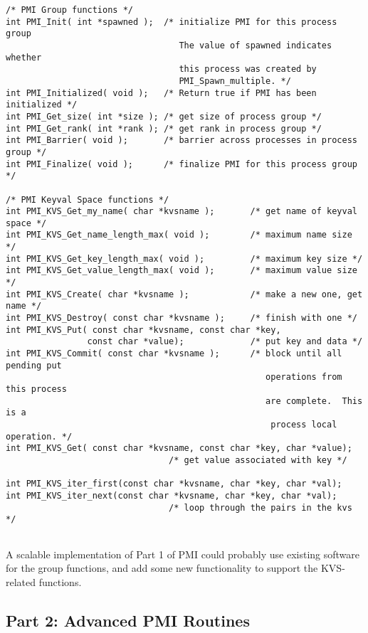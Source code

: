 \documentclass[11pt]{article}
\begin{document}
\begin{small}
\begin{verbatim}
/* PMI Group functions */
int PMI_Init( int *spawned );  /* initialize PMI for this process group
                                  The value of spawned indicates whether
                                  this process was created by
                                  PMI_Spawn_multiple. */
int PMI_Initialized( void );   /* Return true if PMI has been initialized */
int PMI_Get_size( int *size ); /* get size of process group */
int PMI_Get_rank( int *rank ); /* get rank in process group */
int PMI_Barrier( void );       /* barrier across processes in process group */
int PMI_Finalize( void );      /* finalize PMI for this process group */

/* PMI Keyval Space functions */
int PMI_KVS_Get_my_name( char *kvsname );       /* get name of keyval space */
int PMI_KVS_Get_name_length_max( void );        /* maximum name size */
int PMI_KVS_Get_key_length_max( void );         /* maximum key size */
int PMI_KVS_Get_value_length_max( void );       /* maximum value size */
int PMI_KVS_Create( char *kvsname );            /* make a new one, get name */
int PMI_KVS_Destroy( const char *kvsname );     /* finish with one */
int PMI_KVS_Put( const char *kvsname, const char *key,
                const char *value);             /* put key and data */
int PMI_KVS_Commit( const char *kvsname );      /* block until all pending put
                                                   operations from this process
                                                   are complete.  This is a
                                                    process local operation. */
int PMI_KVS_Get( const char *kvsname, const char *key, char *value); 
                                /* get value associated with key */

int PMI_KVS_iter_first(const char *kvsname, char *key, char *val);
int PMI_KVS_iter_next(const char *kvsname, char *key, char *val);
                                /* loop through the pairs in the kvs */
                             
\end{verbatim}
\end{small}

A scalable implementation of Part 1 of PMI could probably use existing software
for the group functions, and add some new functionality to support the
KVS-related functions.

\subsection{Part 2:  Advanced PMI Routines}
\label{sec:part2}
\end{document}
